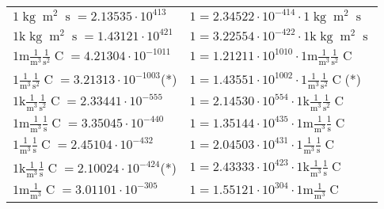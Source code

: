 \begin{center}
\begin{longtable}{l l}
{\color{black}$1 \bm{\mathrm{ }}\operatorname{kg}{\operatorname{m}^2}{\operatorname{s}}{}{} = 2.13535\cdot10^{413} $}   & {\color{black}$ 1 = 2.34522\cdot10^{-414} \cdot 1 \bm{\mathrm{ }}\operatorname{kg}{\operatorname{m}^2}{\operatorname{s}}{}{}$}  \\
{\color{gray}$1 \bm{\mathrm{ k}}\operatorname{kg}{\operatorname{m}^2}{\operatorname{s}}{}{} = 1.43121\cdot10^{421} $}   & {\color{gray}$ 1 = 3.22554\cdot10^{-422} \cdot 1 \bm{\mathrm{ k}}\operatorname{kg}{\operatorname{m}^2}{\operatorname{s}}{}{}$}  \\
\hline{\color{gray}$1 \bm{\mathrm{ m}}\frac1{\operatorname{m}^3}\frac1{\operatorname{s}^2}{\operatorname{C}}{} = 4.21304\cdot10^{-1011} $}   & {\color{gray}$ 1 = 1.21211\cdot10^{1010} \cdot 1 \bm{\mathrm{ m}}\frac1{\operatorname{m}^3}\frac1{\operatorname{s}^2}{\operatorname{C}}{}$}  \\
{\color{black}$1 \bm{\mathrm{ }}\frac1{\operatorname{m}^3}\frac1{\operatorname{s}^2}{\operatorname{C}}{} = 3.21313\cdot10^{-1003} $}\quad(*) & {\color{black}$ 1 = 1.43551\cdot10^{1002} \cdot 1 \bm{\mathrm{ }}\frac1{\operatorname{m}^3}\frac1{\operatorname{s}^2}{\operatorname{C}}{}$}\quad(*)\\
{\color{gray}$1 \bm{\mathrm{ k}}\frac1{\operatorname{m}^3}\frac1{\operatorname{s}^2}{\operatorname{C}}{} = 2.33441\cdot10^{-555} $}   & {\color{gray}$ 1 = 2.14530\cdot10^{554} \cdot 1 \bm{\mathrm{ k}}\frac1{\operatorname{m}^3}\frac1{\operatorname{s}^2}{\operatorname{C}}{}$}  \\
{\color{gray}$1 \bm{\mathrm{ m}}\frac1{\operatorname{m}^3}\frac1{\operatorname{s}}{\operatorname{C}}{} = 3.35045\cdot10^{-440} $}   & {\color{gray}$ 1 = 1.35144\cdot10^{435} \cdot 1 \bm{\mathrm{ m}}\frac1{\operatorname{m}^3}\frac1{\operatorname{s}}{\operatorname{C}}{}$}  \\
{\color{black}$1 \bm{\mathrm{ }}\frac1{\operatorname{m}^3}\frac1{\operatorname{s}}{\operatorname{C}}{} = 2.45104\cdot10^{-432} $}   & {\color{black}$ 1 = 2.04503\cdot10^{431} \cdot 1 \bm{\mathrm{ }}\frac1{\operatorname{m}^3}\frac1{\operatorname{s}}{\operatorname{C}}{}$}  \\
{\color{gray}$1 \bm{\mathrm{ k}}\frac1{\operatorname{m}^3}\frac1{\operatorname{s}}{\operatorname{C}}{} = 2.10024\cdot10^{-424} $}\quad(*) & {\color{gray}$ 1 = 2.43333\cdot10^{423} \cdot 1 \bm{\mathrm{ k}}\frac1{\operatorname{m}^3}\frac1{\operatorname{s}}{\operatorname{C}}{}$}  \\
{\color{gray}$1 \bm{\mathrm{ m}}\frac1{\operatorname{m}^3}{}{\operatorname{C}}{} = 3.01101\cdot10^{-305} $}   & {\color{gray}$ 1 = 1.55121\cdot10^{304} \cdot 1 \bm{\mathrm{ m}}\frac1{\operatorname{m}^3}{}{\operatorname{C}}{}$}  \\

\end{longtable}
\end{center}
